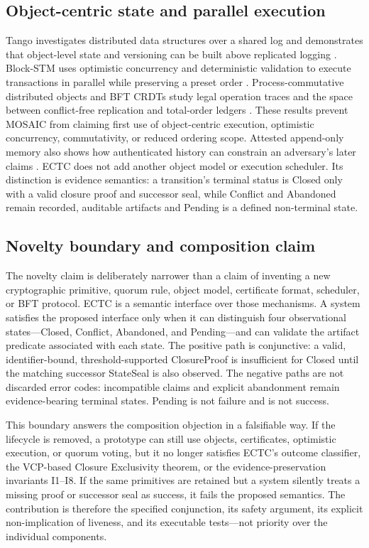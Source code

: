 \documentclass{ledger}
\begin{document}
\subsection{Object-centric state and parallel execution}
Tango investigates distributed data structures over a shared log and demonstrates that object-level state and versioning can be built above replicated logging \cite{Balakrishnan2013Tango}. Block-STM uses optimistic concurrency and deterministic validation to execute transactions in parallel while preserving a preset order \cite{Gelashvili2022BlockSTM}. Process-commutative distributed objects and BFT CRDTs study legal operation traces and the space between conflict-free replication and total-order ledgers \cite{Frey2024BFTCRDT}. These results prevent MOSAIC from claiming first use of object-centric execution, optimistic concurrency, commutativity, or reduced ordering scope. Attested append-only memory also shows how authenticated history can constrain an adversary's later claims \cite{Chun2007AttestedMemory}. ECTC does not add another object model or execution scheduler. Its distinction is evidence semantics: a transition's terminal status is Closed only with a valid closure proof and successor seal, while Conflict and Abandoned remain recorded, auditable artifacts and Pending is a defined non-terminal state.

\subsection{Novelty boundary and composition claim}
The novelty claim is deliberately narrower than a claim of inventing a new cryptographic primitive, quorum rule, object model, certificate format, scheduler, or BFT protocol. ECTC is a semantic interface over those mechanisms. A system satisfies the proposed interface only when it can distinguish four observational states—Closed, Conflict, Abandoned, and Pending—and can validate the artifact predicate associated with each state. The positive path is conjunctive: a valid, identifier-bound, threshold-supported ClosureProof is insufficient for Closed until the matching successor StateSeal is also observed. The negative paths are not discarded error codes: incompatible claims and explicit abandonment remain evidence-bearing terminal states. Pending is not failure and is not success.

This boundary answers the composition objection in a falsifiable way. If the lifecycle is removed, a prototype can still use objects, certificates, optimistic execution, or quorum voting, but it no longer satisfies ECTC's outcome classifier, the VCP-based Closure Exclusivity theorem, or the evidence-preservation invariants I1--I8. If the same primitives are retained but a system silently treats a missing proof or successor seal as success, it fails the proposed semantics. The contribution is therefore the specified conjunction, its safety argument, its explicit non-implication of liveness, and its executable tests—not priority over the individual components.
\end{document}
